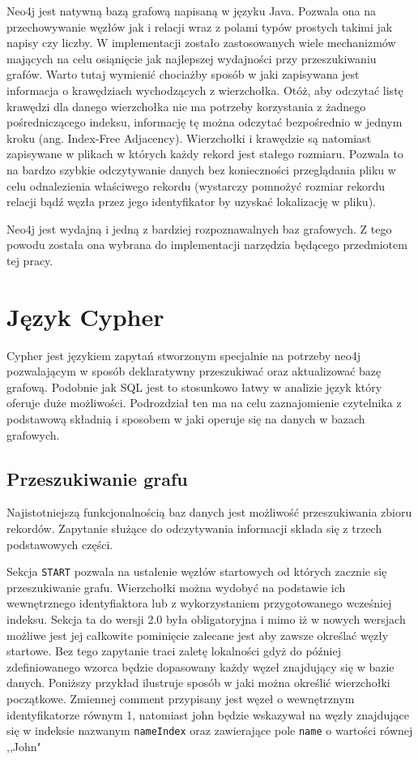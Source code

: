 \documentclass[brudnopis]{xmgr}
\begin{document}
Neo4j jest natywną bazą grafową napisaną w języku Java. Pozwala ona na przechowywanie węzłów jak i relacji wraz z polami typów prostych takimi jak napisy czy liczby. W implementacji zostało zastosowanych wiele mechanizmów mających na celu osiąnięcie jak najlepszej wydajności przy przeszukiwaniu grafów. Warto tutaj wymienić chociażby sposób w jaki zapisywana jest informacja o krawędziach wychodzących z wierzchołka. Otóż, aby odczytać listę krawędzi dla danego wierzchołka nie ma potrzeby korzystania z żadnego pośredniczącego indeksu, informację tę można odczytać bezpośrednio w jednym kroku (ang. Index-Free Adjacency). Wierzchołki i krawędzie są natomiast zapisywane w plikach w których każdy rekord jest stałego rozmiaru. Pozwala to na bardzo szybkie odczytywanie danych bez konieczności przeglądania pliku w celu odnalezienia właściwego rekordu (wystarczy pomnożyć rozmiar rekordu relacji bądź węzła przez jego identyfikator by uzyskać lokalizację w pliku).

Neo4j jest wydajną i jedną z bardziej rozpoznawalnych baz grafowych. Z tego powodu została ona wybrana do implementacji narzędzia będącego przedmiotem tej pracy.

\section{Język Cypher}
Cypher jest językiem zapytań stworzonym specjalnie na potrzeby neo4j pozwalającym w sposób deklaratywny przeszukiwać oraz aktualizować bazę grafową. Podobnie jak SQL jest to stosunkowo łatwy w analizie język który oferuje duże możliwości. Podrozdział ten ma na celu zaznajomienie czytelnika z podstawową składnią i sposobem w jaki operuje się na danych w bazach grafowych.

\subsection{Przeszukiwanie grafu}

Najistotniejszą funkcjonalnością baz danych jest możliwość przeszukiwania zbioru rekordów. Zapytanie służące do odczytywania informacji składa się z trzech podstawowych części.

Sekcja \texttt{START} pozwala na ustalenie węzłów startowych od których zacznie się przeszukiwanie grafu. Wierzchołki można wydobyć na podstawie ich wewnętrznego identyfiaktora lub z wykorzystaniem przygotowanego wcześniej indeksu. Sekcja ta do wersji 2.0 była obligatoryjna i mimo iż w nowych wersjach możliwe jest jej całkowite pominięcie zalecane jest aby zawsze określać węzły startowe. Bez tego zapytanie traci zaletę lokalności gdyż do później zdefiniowanego wzorca będzie dopasowany każdy węzeł znajdujący się w bazie danych. Poniższy przykład ilustruje sposób w jaki można określić wierzchołki początkowe. Zmiennej comment przypisany jest węzeł o wewnętrznym identyfikatorze równym 1, natomiast john będzie wskazywał na węzły znajdujące się w indeksie nazwanym \texttt{nameIndex} oraz zawierające pole \texttt{name} o wartości równej ,,John"
\end{document}
